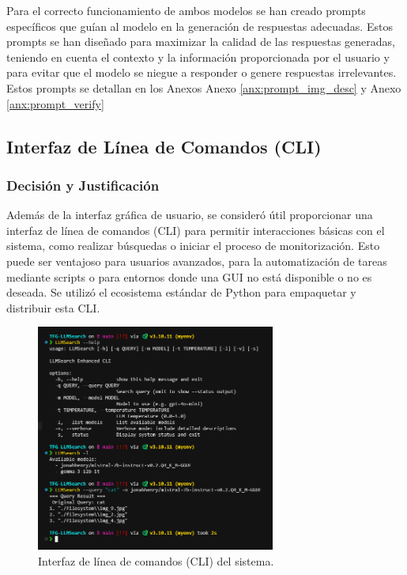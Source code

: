 Para el correcto funcionamiento de ambos modelos se han creado prompts específicos que guían al modelo en la generación de respuestas adecuadas. Estos prompts se han diseñado para maximizar la calidad de las respuestas generadas, teniendo en cuenta el contexto y la información proporcionada por el usuario y para evitar que el modelo se niegue a responder o genere respuestas irrelevantes.
Estos prompts se detallan en los Anexos Anexo \ref{anx:prompt_img_desc} y Anexo \ref{anx:prompt_verify}

\subsection{Interfaz de Línea de Comandos (CLI)}
\label{subsec:decision_terminal}
\subsubsection{Decisión y Justificación}
Además de la interfaz gráfica de usuario, se consideró útil proporcionar una interfaz de línea de comandos (CLI) para permitir interacciones básicas con el sistema, como realizar búsquedas o iniciar el proceso de monitorización. Esto puede ser ventajoso para usuarios avanzados, para la automatización de tareas mediante scripts o para entornos donde una GUI no está disponible o no es deseada. Se utilizó el ecosistema estándar de Python para empaquetar y distribuir esta CLI.

\begin{figure}[!htbp]
    \centering
    \includegraphics[width=0.7\textwidth]{archivos/terminal_example.png}
    \caption{Interfaz de línea de comandos (CLI) del sistema.}
    \label{fig:terminal}
\end{figure}

